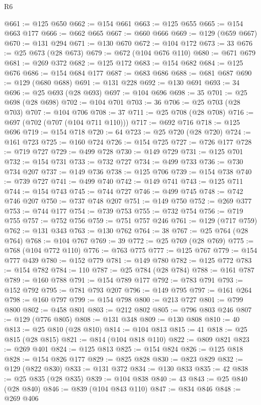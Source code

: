 \begin{lexlean}{R6}
\begin{coremodule}
@661 := @125 @650
@662 := @154 @661
@663 := @125 @655
@665 := @154 @663 @177
@666 := @662 @665
@667 := @660 @666
@669 := @129 (@659 @667)
@670 := @131 @294
@671 := @130 @670
@672 := @104 @172
@673 := 33
@676 := @25 @673 (@28 @673)
@679 := @672 (@104 @676 @110)
@680 := @671 @679
@681 := @269 @372
@682 := @125 @172
@683 := @154 @682
@684 := @125 @676
@686 := @154 @684 @177
@687 := @683 @686
@688 := @681 @687
@690 := @129 (@680 @688)
@691 := @131 @228
@692 := @130 @691
@693 := 34
@696 := @25 @693 (@28 @693)
@697 := @104 @696
@698 := 35
@701 := @25 @698 (@28 @698)
@702 := @104 @701
@703 := 36
@706 := @25 @703 (@28 @703)
@707 := @104 @706
@708 := 37
@711 := @25 @708 (@28 @708)
@716 := @697 (@702 (@707 (@104 @711 @110)))
@717 := @692 @716
@718 := @125 @696
@719 := @154 @718
@720 := 64
@723 := @25 @720 (@28 @720)
@724 := @161 @723
@725 := @160 @724
@726 := @154 @725
@727 := @726 @177
@728 := @719 @727
@729 := @499 @728
@730 := @149 @729
@731 := @125 @701
@732 := @154 @731
@733 := @732 @727
@734 := @499 @733
@736 := @730 @734 @207
@737 := @149 @736
@738 := @125 @706
@739 := @154 @738
@740 := @739 @727
@741 := @499 @740
@742 := @149 @741
@743 := @125 @711
@744 := @154 @743
@745 := @744 @727
@746 := @499 @745
@748 := @742 @746 @207
@750 := @737 @748 @207
@751 := @149 @750
@752 := @269 @377
@753 := @744 @177
@754 := @739 @753
@755 := @732 @754
@756 := @719 @755
@757 := @752 @756
@759 := @751 @757 @246
@761 := @129 (@717 @759)
@762 := @131 @343
@763 := @130 @762
@764 := 38
@767 := @25 @764 (@28 @764)
@768 := @104 @767
@769 := 39
@772 := @25 @769 (@28 @769)
@775 := @768 (@104 @772 @110)
@776 := @763 @775
@777 := @125 @767
@779 := @154 @777 @439
@780 := @152 @779
@781 := @149 @780
@782 := @125 @772
@783 := @154 @782
@784 := 110
@787 := @25 @784 (@28 @784)
@788 := @161 @787
@789 := @160 @788
@791 := @154 @789 @177
@792 := @783 @791
@793 := @152 @792
@795 := @781 @793 @207
@796 := @149 @795
@797 := @161 @264
@798 := @160 @797
@799 := @154 @798
@800 := @213 @727
@801 := @799 @800
@802 := @458 @801
@803 := @212 @802
@805 := @796 @803 @246
@807 := @129 (@776 @805)
@808 := @131 @348
@809 := @130 @808
@810 := 40
@813 := @25 @810 (@28 @810)
@814 := @104 @813
@815 := 41
@818 := @25 @815 (@28 @815)
@821 := @814 (@104 @818 @110)
@822 := @809 @821
@823 := @269 @401
@824 := @125 @813
@825 := @154 @824
@826 := @125 @818
@828 := @154 @826 @177
@829 := @825 @828
@830 := @823 @829
@832 := @129 (@822 @830)
@833 := @131 @372
@834 := @130 @833
@835 := 42
@838 := @25 @835 (@28 @835)
@839 := @104 @838
@840 := 43
@843 := @25 @840 (@28 @840)
@846 := @839 (@104 @843 @110)
@847 := @834 @846
@848 := @269 @406

\end{coremodule}
\end{lexlean}

